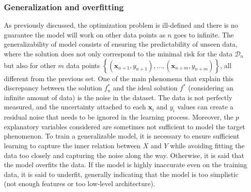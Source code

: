 \documentclass[main]{subfiles}
\begin{document}
\subsubsection{Generalization and overfitting}

As previously discussed, the optimization problem is ill-defined and there is no guarantee the model will work on other data points as $n$ goes to infinite. The generalizability of model consists of ensuring the predictability of unseen data, where the solution does not only correspond to the minimal risk for the data $\mathcal{D}_{n}$ but also for other $m$ data points $\left\{(\mathbf{x}_{n+1},y_{n+1}),\ldots,(\mathbf{x}_{n+m},y_{n+m})\right\}$, all different from the previous set. One of the main phenomena that explain this discrepancy between the solution $f_n^*$ and the ideal solution $f^*$ (considering an infinite amount of data) is the noise in the dataset. The data is not perfectly measured, and the uncertainty attached to each $\mathbf{x}_i$ and $y_i$ values can create a residual noise that needs to be ignored in the learning process. Moreover, the $p$ explanatory variables considered are sometimes not sufficient to model the target phenomenon. To train a generalizable model, it is necessary to ensure sufficient learning to capture the inner relation between $X$ and $Y$ while avoiding fitting the data too closely and capturing the noise along the way. Otherwise, it is said that the model overfits the data. If the model is highly inaccurate even on the training data, it is said to underfit, generally indicating that the model is too simplistic (not enough features or too low-level architecture). 
\end{document}
